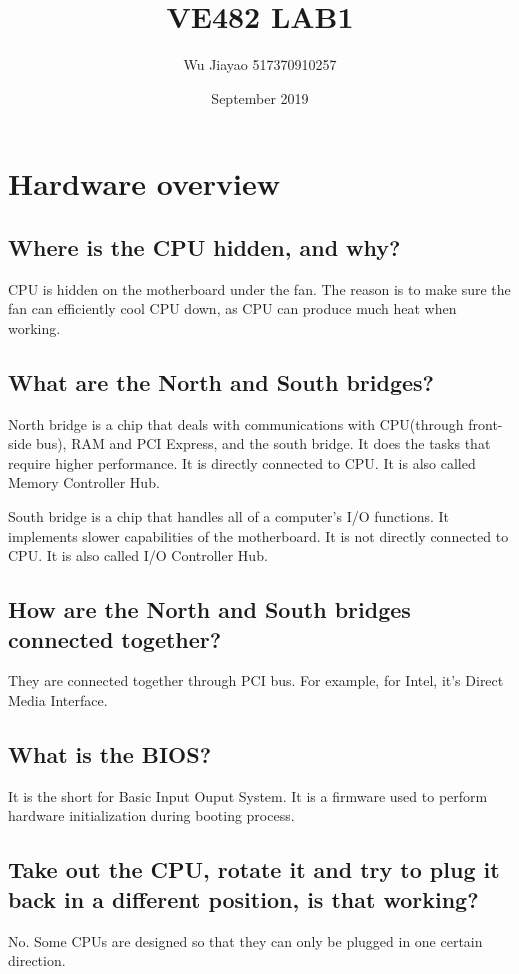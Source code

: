 \documentclass[12pt,a4paper]{article}
\title{VE482 LAB1}
\author{Wu Jiayao 517370910257 }
\date{September 2019}
\theoremstyle{definition}
\begin{document}
\maketitle
\section{Hardware overview}
\subsection{Where is the CPU hidden, and why?}
    \par CPU is hidden on the motherboard under the fan. The reason is to make sure the fan can efficiently cool CPU down, as CPU can produce much heat when working.
\subsection{What are the North and South bridges?}
    \par North bridge is a chip that deals with communications with CPU(through front-side bus), RAM and PCI Express, and the south bridge. It does the tasks that require higher performance. It is directly connected to CPU. It is also called Memory Controller Hub.
    \par South bridge is a chip that handles all of a computer's I/O functions. It implements slower capabilities of the motherboard. It is not directly connected to CPU. It is also called I/O Controller Hub.
\subsection{How are the North and South bridges connected together?}
    \par They are connected together through PCI bus. For example, for Intel, it's Direct Media Interface.
\subsection{What is the BIOS?}
    \par It is the short for Basic Input Ouput System. It is a firmware used to perform hardware initialization during booting process.
\subsection{Take out the CPU, rotate it and try to plug it back in a different position, is that working?}
    \par No. Some CPUs are designed so that they can only be plugged in one certain direction.
\end{document}

